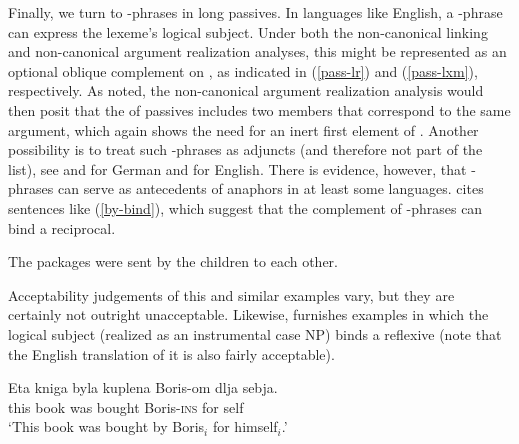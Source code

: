\documentclass[output=paper
                ,modfonts
                ,nonflat
	        ,collection
	        ,collectionchapter
	        ,collectiontoclongg
 	        ,biblatex
                ,babelshorthands
                ,newtxmath
                ,draftmode
                ,colorlinks, citecolor=brown
]{./langsci/langscibook}
\begin{document}

Finally, we turn to -phrases in long passives.
In languages like English, a -phrase can express the lexeme's logical subject.
Under both the non-canonical linking and non-canonical argument realization analyses, this might be represented as an optional oblique complement on \argst, as indicated in (\ref{pass-lr}) and (\ref{pass-lxm}), respectively.
As noted, the non-canonical argument realization analysis would then posit that the \argst of passives includes two members that correspond to the same argument, which again shows the need for an inert first element of \argst.
Another possibility is to treat such -phrases as adjuncts (and therefore not part of the \argst list), see \citet[Chapter 7]{Hoehle78a} and \citet[292--294]{Mueller2003e} for German and \citet[180]{Jackendoff1990} for English. 
There is evidence, however, that -phrases can serve as antecedents of anaphors in at least some languages.
\citet[111]{Collins2005} cites sentences like (\ref{by-bind}), which suggest that the complement of -phrases can bind a reciprocal.

\begin{exe}
\ex\label{by-bind}The packages were sent by the children to each other.
\end{exe} 

Acceptability judgements of this and similar examples vary, but they are certainly not outright unacceptable.  Likewise, \citet[10]{Perlmutter1984} furnishes  examples in which the logical subject (realized as an instrumental case NP) binds a reflexive (note that the English translation of it is also fairly acceptable).

\begin{exe}
\ex     \label{arg-st:russian-pass}
\gll Eta kniga byla kuplena Boris-om dlja sebja.  \\
     this book was bought Boris-\textsc{ins} for self  \\
\glt `This book was bought by Boris$_{i}$ for himself$_{i}$.'
\end{exe}
\end{document}
